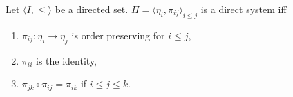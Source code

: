Let $\langle I, \leq \rangle$ be a directed set. $\Pi = \langle \eta_i, \pi_{ij} \rangle_{i \leq j}$ is a direct system iff
\begin{enumerate}
\item $\pi_{ij} : \eta_i \rightarrow \eta_j$ is order preserving for $i \leq j$,
\item $\pi_{ii}$ is the identity,
\item $\pi_{jk} \circ \pi_{ij} = \pi_{ik}$ if $i \leq j \leq k$.
\end{enumerate}
